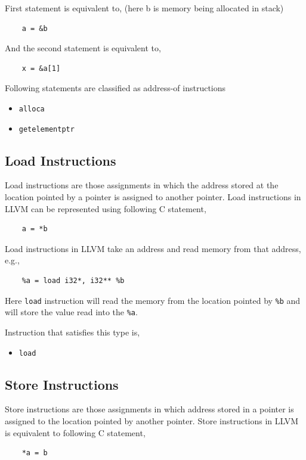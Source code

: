 \documentclass[a4paper,12pt]{report}
\begin{document}
\noindent
First statement is equivalent to, (here b is memory being allocated in stack)

\begin{lstlisting}
    a = &b
\end{lstlisting}

\noindent
And the second statement is equivalent to,
\begin{lstlisting}
    x = &a[1]
\end{lstlisting}

\noindent
Following statements are classified as address-of instructions
\begin{itemize}
    \item \texttt{alloca}
    \item \texttt{getelementptr}
\end{itemize}

\subsection{Load Instructions}
Load instructions are those assignments in which the address stored at the 
location pointed by a pointer is assigned to another pointer.
Load instructions in LLVM can be represented using following C statement,
\begin{lstlisting}
    a = *b
\end{lstlisting}

\noindent
Load instructions in LLVM take an address and read memory from that address,
e.g.,

\begin{verbatim}
    %a = load i32*, i32** %b
\end{verbatim}

\noindent
Here \texttt{load} instruction will read the memory from the location pointed 
by \texttt{\%b} and will store the value read into the \texttt{\%a}.

\noindent
Instruction that satisfies this type is,
\begin{itemize}
 \item \texttt{load}
\end{itemize}


\subsection{Store Instructions}
Store instructions are those assignments in which address stored in a pointer 
is assigned to the location pointed by another pointer.
Store instructions in LLVM is equivalent to following C statement,
\begin{lstlisting}
    *a = b
\end{lstlisting}
\end{document}
